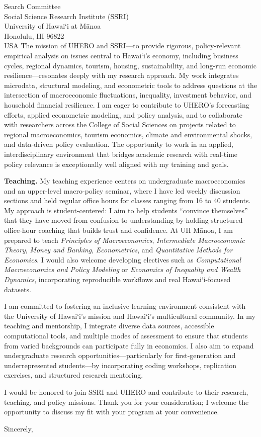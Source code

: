 \documentclass[11pt,letterpaper]{letter}
\begin{document}
\begin{letter}{Search Committee \\
Social Science Research Institute (SSRI) \\
University of Hawai‘i at Mānoa \\
Honolulu, HI 96822 \\ USA}
The mission of UHERO and SSRI—to provide rigorous, policy-relevant empirical analysis on issues central to Hawai‘i’s economy, including business cycles, regional dynamics, tourism, housing, sustainability, and long-run economic resilience—resonates deeply with my research approach. My work integrates microdata, structural modeling, and econometric tools to address questions at the intersection of macroeconomic fluctuations, inequality, investment behavior, and household financial resilience. I am eager to contribute to UHERO’s forecasting efforts, applied econometric modeling, and policy analysis, and to collaborate with researchers across the College of Social Sciences on projects related to regional macroeconomics, tourism economics, climate and environmental shocks, and data-driven policy evaluation. The opportunity to work in an applied, interdisciplinary environment that bridges academic research with real-time policy relevance is exceptionally well aligned with my training and goals.

\textbf{Teaching.} My teaching experience centers on undergraduate macroeconomics and an upper-level macro-policy seminar, where I have led weekly discussion sections and held regular office hours for classes ranging from 16 to 40 students. My approach is student-centered: I aim to help students “convince themselves” that they have moved from confusion to understanding by holding structured office-hour coaching that builds trust and confidence. At UH Mānoa, I am prepared to teach \textit{Principles of Macroeconomics}, \textit{Intermediate Macroeconomic Theory}, \textit{Money and Banking}, \textit{Econometrics}, and \textit{Quantitative Methods for Economics}. I would also welcome developing electives such as \textit{Computational Macroeconomics and Policy Modeling} or \textit{Economics of Inequality and Wealth Dynamics}, incorporating reproducible workflows and real Hawai‘i-focused datasets.

I am committed to fostering an inclusive learning environment consistent with the University of Hawai‘i’s mission and Hawai‘i’s multicultural community. In my teaching and mentorship, I integrate diverse data sources, accessible computational tools, and multiple modes of assessment to ensure that students from varied backgrounds can participate fully in economics. I also aim to expand undergraduate research opportunities—particularly for first-generation and underrepresented students—by incorporating coding workshops, replication exercises, and structured research mentoring.

I would be honored to join SSRI and UHERO and contribute to their research, teaching, and policy missions. Thank you for your consideration; I welcome the opportunity to discuss my fit with your program at your convenience.

\closing{Sincerely,}

\end{letter}
\end{document}
